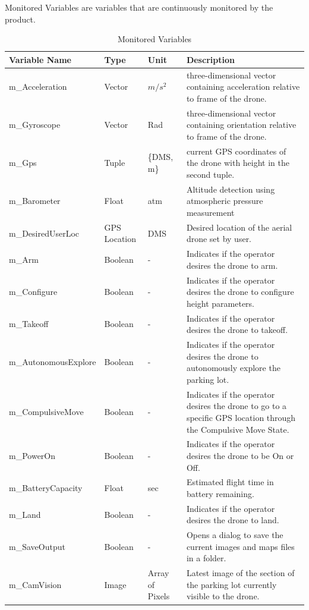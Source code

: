 \documentclass{article}
\begin{document}
\newpage
Monitored Variables are variables that are continuously monitored by the product.
\begin{table}[!h]
\begin{center}
\caption {Monitored Variables} \label{tab:title}
\begin{tabular}{ | m{3cm} | m{2cm} | m{2cm} | m{6cm} | } 
\hline
 Variable Name & Type & Unit & Description \\ 
 \hline
m\_Acceleration	& Vector& $m/s^2$ & three-dimensional vector containing acceleration relative to frame of the drone. \\
\hline
m\_Gyroscope & Vector	&Rad &	 three-dimensional vector containing orientation relative to frame of the drone.\\
\hline
m\_Gps	& Tuple &	\{DMS, m\} &	 current GPS coordinates of the drone with height in the second tuple.\\
\hline
m\_Barometer	& Float&	atm	 &Altitude detection using atmospheric pressure measurement\\
\hline
m\_DesiredUserLoc &	GPS Location& DMS &	 Desired location of the aerial drone set by user.\\
\hline
m\_Arm &	Boolean	 &  - &	Indicates if the operator desires the drone to arm.  \\
\hline
m\_Configure &	Boolean	 &  - &	Indicates if the operator desires the drone to configure height parameters.  \\
\hline
m\_Takeoff &	Boolean	 &  - &	Indicates if the operator desires the drone to takeoff.  \\
\hline
m\_AutonomousExplore &	Boolean &	 -	 &Indicates if the operator desires the drone to autonomously explore the parking lot.\\ 
\hline
m\_CompulsiveMove &	Boolean &	 -	 &Indicates if the operator desires the drone to go to a specific GPS location through the Compulsive Move State.\\ 
\hline
m\_PowerOn&	Boolean  &	- &	Indicates if the operator desires the drone to be On or Off.\\
\hline
m\_BatteryCapacity&	Float  &	sec &	Estimated flight time in battery remaining. \\
\hline
m\_Land&Boolean&	-&	Indicates if the operator desires the drone to land.\\
\hline
m\_SaveOutput&Boolean&	-&	Opens a dialog to save the current images and maps files in a folder.\\
\hline
 m\_CamVision &	Image&	Array of Pixels&	Latest image of the section of the parking lot currently visible to the drone.\\
\hline

\end{tabular}
\end{center}
\end{table}
\end{document}
